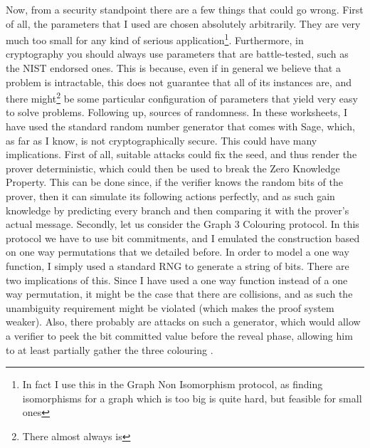 \documentclass{article}
\begin{document}
\par Now, from a security standpoint there are a few things that could go wrong.
First of all, the parameters that I used are chosen absolutely arbitrarily. They are very much too small for any kind
of serious application\footnote{In fact I use this in the Graph Non Isomorphism protocol, as finding isomorphisms for a
    graph which is too big is quite hard, but feasible for small ones}.
Furthermore, in cryptography you should always use parameters that are battle-tested, such as the NIST \cite{barkerRecommendationPairWiseKeyEstablishment2018}
endorsed ones. This is because, even if in general we believe that a problem is intractable, this does not guarantee that
all of its instances are, and there might\footnote{There almost always is} be some particular configuration of parameters
that yield very easy to solve problems. Following up, sources of randomness. In these worksheets, I have used the standard
random number generator that comes with Sage, which, as far as I know, is not cryptographically secure. This could have
many implications. First of all, suitable attacks could fix the seed, and thus render the prover deterministic, which could
then be used to break the Zero Knowledge Property. This can be done since, if the verifier knows the random bits of the
prover, then it can simulate its following actions perfectly, and as such gain knowledge by predicting every branch and
then comparing it with the prover's actual message. Secondly, let us consider the Graph 3 Colouring
protocol. In this protocol we have to use bit commitments, and I emulated the construction based on one way permutations
that we detailed before. In order to model a one way function, I simply used a standard RNG to generate a string of bits.
There are two implications of this. Since I have used a one way function instead of a one way permutation,
it might be the case that there are collisions, and as such the unambiguity requirement might be violated (which makes
the proof system weaker). Also, there probably are attacks on such a generator, which would allow a verifier to peek
the bit committed value before the reveal phase, allowing him to at least partially gather the three colouring .



\appendix
\end{document}
